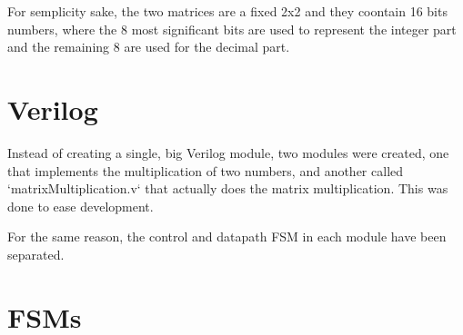 \documentclass[12pt]{article}
\begin{document}
For semplicity sake, the two matrices are a fixed 2x2 and they coontain 16 bits numbers, where the 8 most significant bits are used to represent the integer part and the remaining 8 are used for the decimal part.

\section{Verilog}
Instead of creating a single, big Verilog module, two modules were created, one that implements the multiplication of two numbers, and another called `matrixMultiplication.v` that actually does the matrix multiplication. This was done to ease development.

For the same reason, the control and datapath FSM in each module have been separated.
\section{FSMs}
\end{document}
